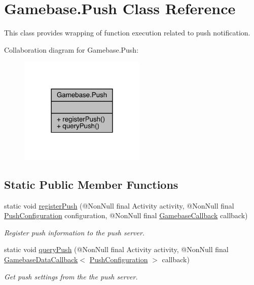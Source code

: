 \hypertarget{classcom_1_1toast_1_1android_1_1gamebase_1_1_gamebase_1_1_push}{}\section{Gamebase.\+Push Class Reference}
\label{classcom_1_1toast_1_1android_1_1gamebase_1_1_gamebase_1_1_push}


This class provides wrapping of function execution related to push notification.  




Collaboration diagram for Gamebase.\+Push\+:\nopagebreak
\begin{figure}[H]
\begin{center}
\leavevmode
\includegraphics[width=170pt]{classcom_1_1toast_1_1android_1_1gamebase_1_1_gamebase_1_1_push__coll__graph}
\end{center}
\end{figure}
\subsection*{Static Public Member Functions}
\begin{DoxyCompactItemize}
\item 
static void \hyperlink{classcom_1_1toast_1_1android_1_1gamebase_1_1_gamebase_1_1_push_ad8a4f6af1686327bf9af016b38988dff}{register\+Push} (@Non\+Null final Activity activity, @Non\+Null final \hyperlink{classcom_1_1toast_1_1android_1_1gamebase_1_1base_1_1push_1_1_push_configuration}{Push\+Configuration} configuration, @Non\+Null final \hyperlink{interfacecom_1_1toast_1_1android_1_1gamebase_1_1_gamebase_callback}{Gamebase\+Callback} callback)
\begin{DoxyCompactList}\small\item\em Register push information to the push server. \end{DoxyCompactList}\item 
static void \hyperlink{classcom_1_1toast_1_1android_1_1gamebase_1_1_gamebase_1_1_push_a4745e49979a4b9e6867c9361c72e1556}{query\+Push} (@Non\+Null final Activity activity, @Non\+Null final \hyperlink{interfacecom_1_1toast_1_1android_1_1gamebase_1_1_gamebase_data_callback}{Gamebase\+Data\+Callback}$<$ \hyperlink{classcom_1_1toast_1_1android_1_1gamebase_1_1base_1_1push_1_1_push_configuration}{Push\+Configuration} $>$ callback)
\begin{DoxyCompactList}\small\item\em Get push settings from the the push server. \end{DoxyCompactList}\end{DoxyCompactItemize}


